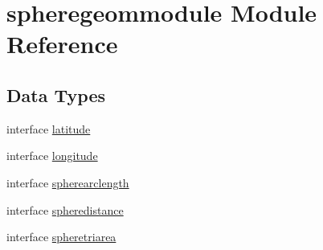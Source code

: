 \hypertarget{classspheregeommodule}{\section{spheregeommodule Module Reference}
\label{classspheregeommodule}
}
\subsection*{Data Types}
\begin{DoxyCompactItemize}
\item 
interface \hyperlink{interfacespheregeommodule_1_1latitude}{latitude}
\item 
interface \hyperlink{interfacespheregeommodule_1_1longitude}{longitude}
\item 
interface \hyperlink{interfacespheregeommodule_1_1spherearclength}{spherearclength}
\item 
interface \hyperlink{interfacespheregeommodule_1_1spheredistance}{spheredistance}
\item 
interface \hyperlink{interfacespheregeommodule_1_1spheretriarea}{spheretriarea}
\end{DoxyCompactItemize}
